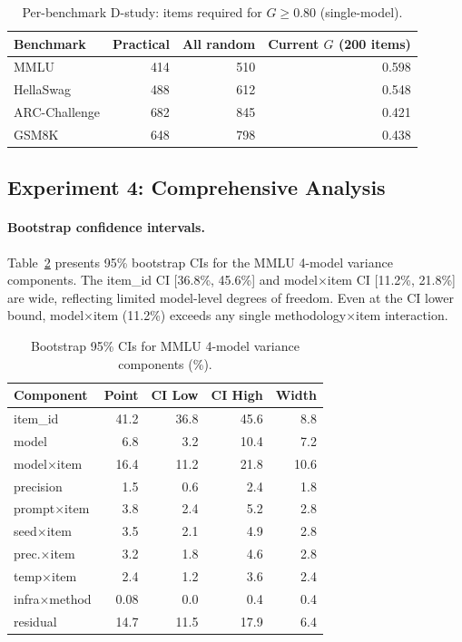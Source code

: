 \documentclass[11pt,letterpaper]{article}
\begin{document}
\begin{table}[t]
\centering
\caption{Per-benchmark D-study: items required for $G \geq 0.80$ (single-model).}
\label{tab:dstudy_benchmark}
\small
\begin{tabular}{@{}lrrr@{}}
\toprule
Benchmark & Practical & All random & Current $G$ (200 items) \\
\midrule
MMLU & 414 & 510 & 0.598 \\
HellaSwag & 488 & 612 & 0.548 \\
ARC-Challenge & 682 & 845 & 0.421 \\
GSM8K & 648 & 798 & 0.438 \\
\bottomrule
\end{tabular}
\end{table}

\subsection{Experiment 4: Comprehensive Analysis}

\paragraph{Bootstrap confidence intervals.}
Table~\ref{tab:bootstrap} presents 95\% bootstrap CIs for the MMLU 4-model variance components.
The item\_id CI [36.8\%, 45.6\%] and model$\times$item CI [11.2\%, 21.8\%] are wide, reflecting limited model-level degrees of freedom.
Even at the CI lower bound, model$\times$item (11.2\%) exceeds any single methodology$\times$item interaction.

\begin{table}[t]
\centering
\caption{Bootstrap 95\% CIs for MMLU 4-model variance components (\%).}
\label{tab:bootstrap}
\small
\begin{tabular}{@{}lrrrr@{}}
\toprule
Component & Point & CI Low & CI High & Width \\
\midrule
item\_id & 41.2 & 36.8 & 45.6 & 8.8 \\
model & 6.8 & 3.2 & 10.4 & 7.2 \\
model$\times$item & 16.4 & 11.2 & 21.8 & 10.6 \\
precision & 1.5 & 0.6 & 2.4 & 1.8 \\
prompt$\times$item & 3.8 & 2.4 & 5.2 & 2.8 \\
seed$\times$item & 3.5 & 2.1 & 4.9 & 2.8 \\
prec.$\times$item & 3.2 & 1.8 & 4.6 & 2.8 \\
temp$\times$item & 2.4 & 1.2 & 3.6 & 2.4 \\
infra$\times$method & 0.08 & 0.0 & 0.4 & 0.4 \\
residual & 14.7 & 11.5 & 17.9 & 6.4 \\
\bottomrule
\end{tabular}
\end{table}
\end{document}
